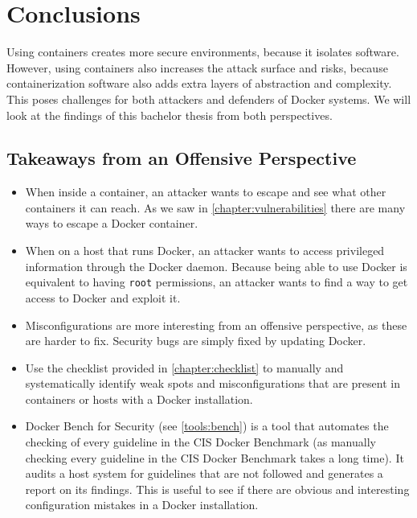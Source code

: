 \chapter{Conclusions}\label{chapter:conclusions}
Using containers creates more secure environments, because it isolates software. However, using containers also increases the attack surface and risks, because containerization software also adds extra layers of abstraction and complexity. This poses challenges for both attackers and defenders of Docker systems. We will look at the findings of this bachelor thesis from both perspectives.

\section{Takeaways from an Offensive Perspective}

\begin{itemize}
    \item When inside a container, an attacker wants to escape and see what other containers it can reach. As we saw in \autoref{chapter:vulnerabilities} there are many ways to escape a Docker container.

    \item When on a host that runs Docker, an attacker wants to access privileged information through the Docker daemon. Because being able to use Docker is equivalent to having \lstinline{root} permissions, an attacker wants to find a way to get access to Docker and exploit it.

    \item Misconfigurations are more interesting from an offensive perspective, as these are harder to fix. Security bugs are simply fixed by updating Docker.

    \item Use the checklist provided in \autoref{chapter:checklist} to manually and systematically identify weak spots and misconfigurations that are present in containers or hosts with a Docker installation.

    \item Docker Bench for Security (see \autoref{tools:bench}) is a tool that automates the checking of every guideline in the CIS Docker Benchmark (as manually checking every guideline in the CIS Docker Benchmark takes a long time). It audits a host system for guidelines that are not followed and generates a report on its findings. This is useful to see if there are obvious and interesting configuration mistakes in a Docker installation.

\end{itemize}


